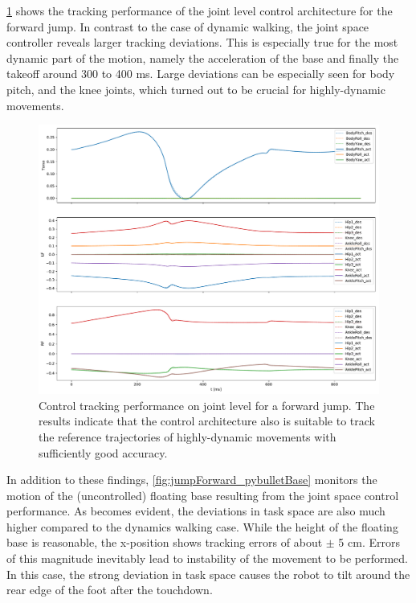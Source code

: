 \cref{fig:jumpForward_pybulletTracking} shows the tracking performance of the joint level control architecture for the forward jump. In contrast to the case of dynamic walking, the joint space controller reveals larger tracking deviations. This is especially true for the most dynamic part of the motion, namely the acceleration of the base and finally the takeoff around 300 to 400 ms. Large deviations can be especially seen for body pitch, and the knee joints, which turned out to be crucial for highly-dynamic movements. 

\begin{figure}[h!]
\centering	
\includegraphics[width=.85\textwidth]{fig/jumpForward/pybullet/pybulletTracking}
\caption[Control tracking performance on joint level for a forward jump]{Control tracking performance on joint level for a forward jump. The results indicate that the control architecture also is suitable to track the reference trajectories of highly-dynamic movements with sufficiently good accuracy.}
\label{fig:jumpForward_pybulletTracking}
\end{figure}

In addition to these findings, \cref{fig:jumpForward_pybulletBase} monitors the motion of the (uncontrolled) floating base resulting from the joint space control performance. As becomes evident, the deviations in task space are also much higher compared to the dynamics walking case. While the height of the floating base is reasonable, the x-position shows tracking errors of about $\pm$ 5 cm. Errors of this magnitude inevitably lead to instability of the movement to be performed. In this case, the strong deviation in task space causes the robot to tilt around the rear edge of the foot after the touchdown. 

